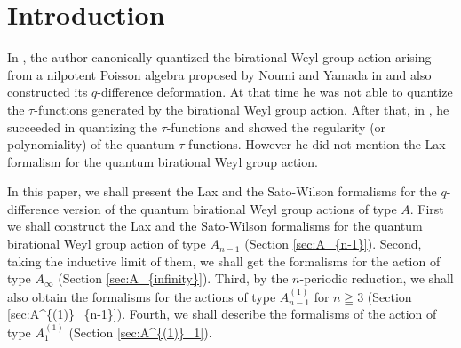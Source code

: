 \documentclass[12pt,twoside]{article}
\theoremstyle{plain} %
\theoremstyle{definition} %
\theoremstyle{definition} %
\numberwithin{theorem}{section}
\numberwithin{equation}{section}
\numberwithin{figure}{section}
\numberwithin{table}{section}
\newcommand\secref[1]{Section \ref{#1}}
\begin{document}
\title{\TITLE}
\author{\AUTHOR}
\date{\DATE}
\maketitle
\begin{abstract}
  \ABSTRACT
\end{abstract}
\tableofcontents
\setcounter{section}{-1} %

\section{Introduction}

In \cite{Kuroki2008}, 
the author canonically quantized 
the birational Weyl group action 
arising from a nilpotent Poisson algebra 
proposed by Noumi and Yamada in \cite{NY0012028}
and also constructed its $q$-difference deformation. 
At that time he was not able to quantize the $\tau$-functions 
generated by the birational Weyl group action.
After that, in \cite{Kuroki2012a}, he succeeded 
in quantizing the $\tau$-functions
and showed the regularity (or polynomiality) 
of the quantum $\tau$-functions.
However he did not mention the Lax formalism 
for the quantum birational Weyl group action.  

In this paper, we shall present the Lax and the Sato-Wilson formalisms
for the $q$-difference version of the quantum birational Weyl group actions
of type $A$.  
First we shall construct the Lax and the Sato-Wilson formalisms 
for the quantum birational Weyl group action of type $A_{n-1}$ 
(\secref{sec:A_{n-1}}).
Second, taking the inductive limit of them,
we shall get the formalisms for the action of type $A_\infty$
(\secref{sec:A_{infinity}}).  
Third, by the $n$-periodic reduction, we shall also obtain the formalisms 
for the actions of type $A^{(1)}_{n-1}$ for $n\geqq 3$
(\secref{sec:A^{(1)}_{n-1}}).
Fourth, we shall describe the formalisms of the action of type $A^{(1)}_1$
(\secref{sec:A^{(1)}_1}).

\end{document}
